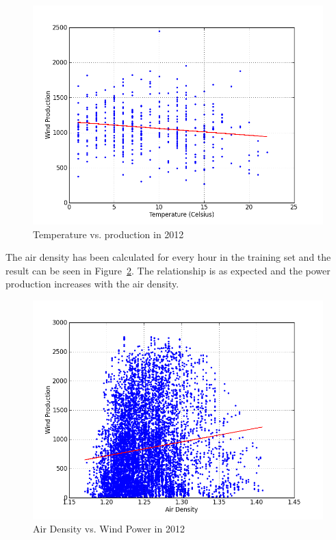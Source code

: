 \begin{figure}[h!]
\centering
\includegraphics[width=0.99\linewidth,natwidth=898,natheight=587]{billeder/windProductionForTemperature13.png}
\caption{Temperature vs. production in 2012}
\label{fig:tempVsProd}
\end{figure}

The air density has been calculated for every hour in the training set and the result can be seen in Figure~\ref{fig:windProductionVsAirDensity}. The relationship is as expected and the power production increases with the air density.

\begin{figure}[h!]
\centering
\includegraphics[width=0.99\linewidth,natwidth=898,natheight=587]{billeder/windProductionVsAirDensity.png}
\caption{Air Density vs. Wind Power in 2012}
\label{fig:windProductionVsAirDensity}
\end{figure}

